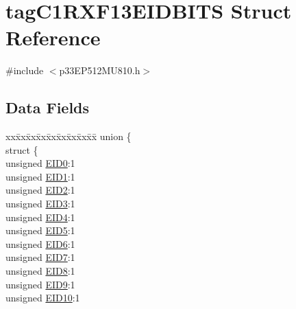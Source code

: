\hypertarget{structtag_c1_r_x_f13_e_i_d_b_i_t_s}{}\section{tag\+C1\+R\+X\+F13\+E\+I\+D\+B\+I\+TS Struct Reference}
\label{structtag_c1_r_x_f13_e_i_d_b_i_t_s}


{\ttfamily \#include $<$p33\+E\+P512\+M\+U810.\+h$>$}

\subsection*{Data Fields}
\begin{DoxyCompactItemize}
\item 
\begin{tabbing}
xx\=xx\=xx\=xx\=xx\=xx\=xx\=xx\=xx\=\kill
union \{\\
\>struct \{\\
\>\>unsigned \hyperlink{structtag_c1_r_x_f13_e_i_d_b_i_t_s_a9da8b7b30247e4f9cd8cc056549aa9fd}{EID0}:1\\
\>\>unsigned \hyperlink{structtag_c1_r_x_f13_e_i_d_b_i_t_s_afd6c139491d147c1262f3d051c6691e9}{EID1}:1\\
\>\>unsigned \hyperlink{structtag_c1_r_x_f13_e_i_d_b_i_t_s_a36ec62d8d3c5acd5d15e6691dc099a94}{EID2}:1\\
\>\>unsigned \hyperlink{structtag_c1_r_x_f13_e_i_d_b_i_t_s_ab895f7d0ac289a0383b607cbc62eebe2}{EID3}:1\\
\>\>unsigned \hyperlink{structtag_c1_r_x_f13_e_i_d_b_i_t_s_a136d5a709d6618d40acceccb43036656}{EID4}:1\\
\>\>unsigned \hyperlink{structtag_c1_r_x_f13_e_i_d_b_i_t_s_a8dffb2d86a6c184df505ae7c71a58710}{EID5}:1\\
\>\>unsigned \hyperlink{structtag_c1_r_x_f13_e_i_d_b_i_t_s_af8a8574102515d8f1a4b7fd1685d0532}{EID6}:1\\
\>\>unsigned \hyperlink{structtag_c1_r_x_f13_e_i_d_b_i_t_s_a84c3262e67f8d5fd387ac10bde6fa9b1}{EID7}:1\\
\>\>unsigned \hyperlink{structtag_c1_r_x_f13_e_i_d_b_i_t_s_acca25e0b7d86eb499d01f85222baea87}{EID8}:1\\
\>\>unsigned \hyperlink{structtag_c1_r_x_f13_e_i_d_b_i_t_s_ac6748f73d4ada8538b06548be4f396c2}{EID9}:1\\
\>\>unsigned \hyperlink{structtag_c1_r_x_f13_e_i_d_b_i_t_s_a9cea8e77ecbb72bd3b08102412793725}{EID10}:1\\

\end{tabbing}
\end{DoxyCompactItemize}
